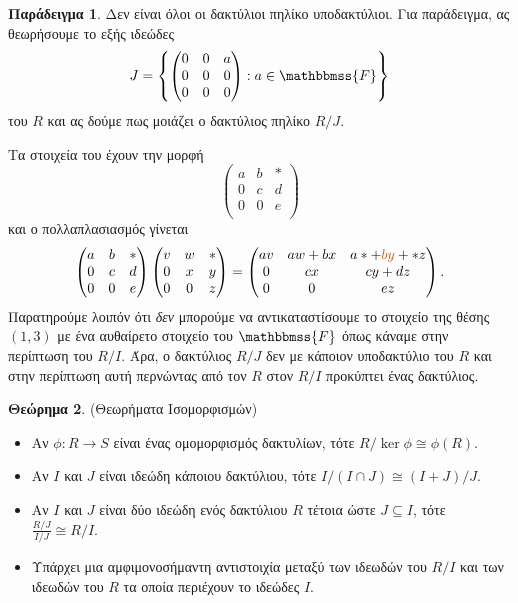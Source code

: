 \documentclass[12pt,a4paper,reqno]{amsart}
\theoremstyle{definition}
\newtheorem{theorem}{Θεώρημα}
\newtheorem{example}[theorem]{Παράδειγμα}
\theoremstyle{remark}
\numberwithin{theorem}{section}
\numberwithin{exercise}{section}
\numberwithin{equation}{section}
\newcommand{\FF}{\mathbbmss{F}}
\renewcommand{\to}{\rightarrow}
\begin{document}
\begin{example}
Δεν είναι όλοι οι δακτύλιοι πηλίκο  υποδακτύλιοι. Για παράδειγμα, ας θεωρήσουμε το εξής ιδεώδες 
\[
J = \left\{
    \begin{pmatrix}
        0 & 0 & a \\
        0 & 0 & 0 \\
        0 & 0 & 0
    \end{pmatrix} : a \in \FF
\right\}
\]
του $R$ και ας δούμε πως μοιάζει ο δακτύλιος πηλίκο $R/J$. 

Τα στοιχεία του έχουν την μορφή 
\[
\begin{pmatrix}
    a & b & \ast \\ 
    0 & c & d \\ 
    0 & 0 & e \\ 
\end{pmatrix}
\]
και ο πολλαπλασιασμός γίνεται 
\[
\begin{pmatrix}
    a & b & \ast \\ 
    0 & c & d \\ 
    0 & 0 & e \\ 
\end{pmatrix}
\begin{pmatrix}
    v & w & \ast \\ 
    0 & x & y \\ 
    0 & 0 & z \\ 
\end{pmatrix} = 
\begin{pmatrix}
    av & aw + bx & a\ast + \textcolor{burntorange}{by} + \ast{z} \\ 
    0 & cx & cy + dz \\ 
    0 & 0 & ez
\end{pmatrix}.
\]
Παρατηρούμε λοιπόν ότι \emph{δεν} μπορούμε να αντικαταστίσουμε το στοιχείο της θέσης $(1,3)$ με ένα αυθαίρετο στοιχείο του $\FF$ όπως κάναμε στην περίπτωση του $R/I$. Άρα, ο δακτύλιος $R/J$ δεν  με κάποιον υποδακτύλιο του $R$ και στην περίπτωση αυτή περνώντας από τον $R$ στον $R/I$ προκύπτει ένας  δακτύλιος.
\end{example}

\begin{theorem}{\rm(Θεωρήματα Ισομορφισμών)}
    \label{thm:isomorphism_theorems}
    \leavevmode
    \begin{itemize}
        \item[(1)] Αν $\phi : R \to S$ είναι ένας ομομορφισμός δακτυλίων, τότε $R/\ker\phi \cong \phi(R)$.
        \item[(2)] Αν $I$ και $J$ είναι ιδεώδη κάποιου δακτύλιου, τότε $I/(I\cap{J}) \cong (I+J)/J$.
        \item[(3)] Αν $I$ και $J$ είναι δύο ιδεώδη ενός δακτύλιου $R$ τέτοια ώστε $J \subseteq I$, τότε $\frac{R/J}{I/J} \cong R/I$.
        \item[(4)] Υπάρχει μια αμφιμονοσήμαντη αντιστοιχία μεταξύ των ιδεωδών του $R/I$ και των ιδεωδών του $R$ τα οποία περιέχουν το ιδεώδες $I$.
    \end{itemize}
\end{theorem}
\end{document}
